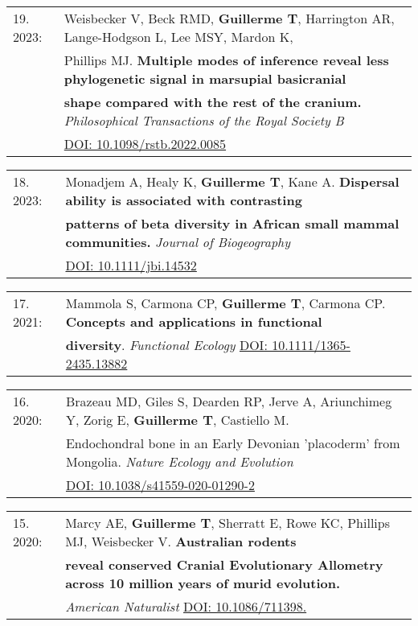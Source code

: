 \documentclass[10pt,a4paper]{article}
\begin{document}
{\begin{tabular}{ll}
19. 2023: & Weisbecker V, Beck RMD, \textbf{Guillerme T}, Harrington AR, Lange-Hodgson L, Lee MSY, Mardon K,\\
      & Phillips MJ. \textbf{Multiple modes of inference reveal less phylogenetic signal in marsupial basicranial}\\
      & \textbf{shape compared with the rest of the cranium.} \textit{Philosophical Transactions of the Royal Society B}\\
      & \href{https://royalsocietypublishing.org/doi/10.1098/rstb.2022.0085}{DOI: 10.1098/rstb.2022.0085}\\
\end{tabular}
\bigskip

\begin{tabular}{ll}
18. 2023: & Monadjem A, Healy K, \textbf{Guillerme T}, Kane A. \textbf{Dispersal ability is associated with contrasting}\\
      & \textbf{patterns of beta diversity in African small mammal communities.} \textit{Journal of Biogeography}\\
      & \href{https://onlinelibrary.wiley.com/doi/10.1111/jbi.14532}{DOI: 10.1111/jbi.14532 }\\
\end{tabular}
\bigskip

\begin{tabular}{ll}
17. 2021: & Mammola S, Carmona CP, \textbf{Guillerme T}, Carmona CP. \textbf{Concepts and applications in functional}\\
      & \textbf{diversity}. \textit{Functional Ecology} \href{https://besjournals.onlinelibrary.wiley.com/doi/10.1111/1365-2435.13882}{DOI: 10.1111/1365-2435.13882}\\
\end{tabular}
\bigskip

\begin{tabular}{ll}
16. 2020: & Brazeau MD, Giles S, Dearden RP, Jerve A, Ariunchimeg Y, Zorig E, \textbf{Guillerme T}, Castiello M.\\
      & Endochondral bone in an Early Devonian 'placoderm' from Mongolia. \textit{Nature Ecology and Evolution}\\
      & \href{https://www.nature.com/articles/s41559-020-01290-2}{DOI: 10.1038/s41559-020-01290-2}\\
\end{tabular}
\bigskip

\begin{tabular}{ll}
15. 2020: & Marcy AE, \textbf{Guillerme T}, Sherratt E, Rowe KC, Phillips MJ, Weisbecker V. \textbf{Australian rodents}\\
      & \textbf{reveal conserved Cranial Evolutionary Allometry across 10 million years of murid evolution.}\\
      & \textit{American Naturalist} \href{https://www.journals.uchicago.edu/doi/abs/10.1086/711398?journalCode=an}{DOI: 10.1086/711398.}\\
\end{tabular}
\bigskip

}
\end{document}
